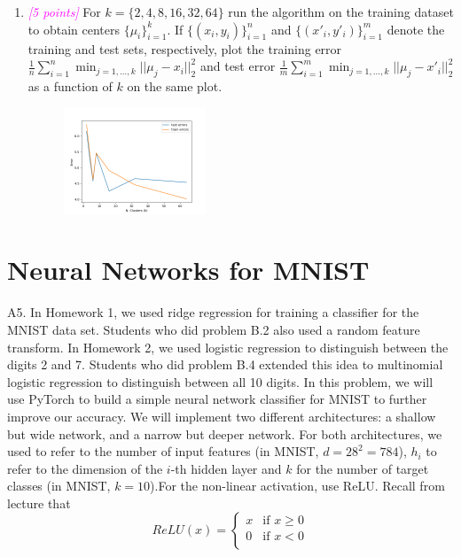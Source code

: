 \documentclass{article}
\newcommand{\1}{\mathbf{1}}
\newcommand{\points}[1]{\small\textcolor{magenta}{\emph{[#1 points]}} \normalsize}
\begin{document}
\begin{enumerate}
    \newpage
    \item \points{5} For $k=\{2,4,8,16,32,64\}$ run the algorithm on the training dataset to obtain centers $\{\mu_i\}^k_{i=1}$. If $\{(x_i,y_i)\}^n_{i=1}$ and $\{(x'_i,y'_i)\}^m_{i=1}$ denote the training and test sets, respectively, plot the training error $\frac{1}{n}\sum^n_{i=1}\min_{j=1,\hdots,k} ||\mu_j - x_i ||^2_2$ and test error $\frac{1}{m}\sum^m_{i=1} \min_{j=1,\hdots,k} ||\mu_j - x'_i||^2_2$ as a function of $k$ on the same plot.
    \begin{figure}[h!]
    \centering 
    \includegraphics[width=0.4\textwidth]{HW3/HW3_plots/A4c_Errors1.png}
    \end{figure}
\end{enumerate}



\newpage
\section*{Neural Networks for MNIST}
A5. In Homework 1, we used ridge regression for training a classifier for the MNIST data set. Students who did problem B.2 also used a random feature transform. In Homework 2, we used logistic regression to distinguish between the digits 2 and 7. Students who did problem B.4 extended this idea to multinomial logistic regression to distinguish between all 10 digits. In this problem, we will use PyTorch to build a simple neural network classifier for MNIST to further improve our accuracy. We will implement two different architectures: a shallow but wide network, and a narrow but deeper network. For both architectures, we used to refer to the number of input features (in MNIST, $d=28^2=784$), $h_i$ to refer to the dimension of the $i$-th hidden layer and $k$ for the number of target classes (in MNIST, $k=10$).For the non-linear activation, use ReLU. Recall from lecture that
$$ReLU(x) = \begin{cases} 
    x &\mbox{if } x \geq 0\\
    0 &\mbox{if } x < 0 \\
\end{cases} $$
\end{document}
